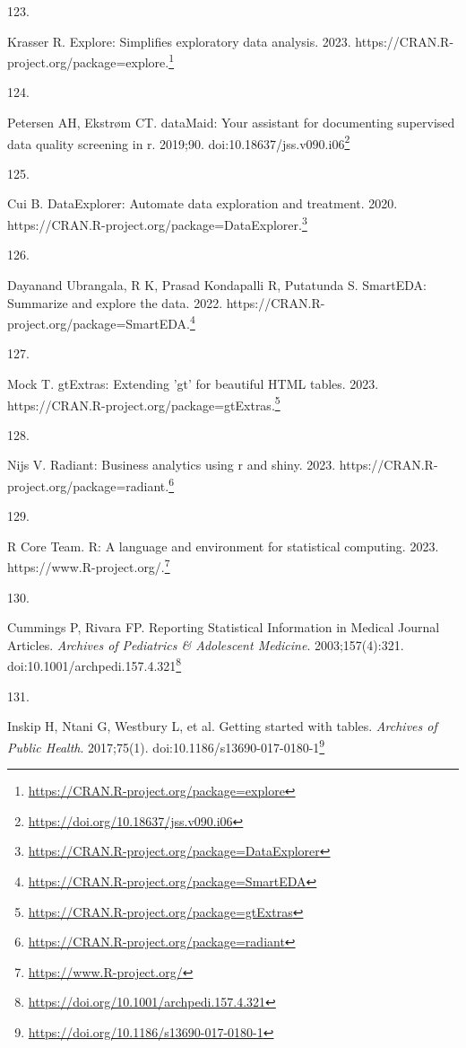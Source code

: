 \documentclass[
  a4paper,
]{book}
\newlength{\cslhangindent}
\newlength{\csllabelwidth}
\newlength{\cslentryspacingunit} %
\newenvironment{CSLReferences}[2] %
 {%
  \setlength{\parindent}{0pt}
  \ifodd #1
  \let\oldpar\par
  \def\par{\hangindent=\cslhangindent\oldpar}
  \fi
  \setlength{\parskip}{#2\cslentryspacingunit}
 }%
 {}
\newcommand{\CSLLeftMargin}[1]{\parbox[t]{\csllabelwidth}{#1}}
\newcommand{\CSLRightInline}[1]{\parbox[t]{\linewidth - \csllabelwidth}{#1}\break}
\renewcommand{\href}[2]{#2\footnote{\url{#1}}}
\begin{document}
\begin{CSLReferences}{0}{0}
\leavevmode{}%
\CSLLeftMargin{123. }%
\CSLRightInline{Krasser R. Explore: Simplifies exploratory data analysis. 2023. \href{https://CRAN.R-project.org/package=explore}{https://CRAN.R-project.org/package=explore.}}

\leavevmode{}%
\CSLLeftMargin{124. }%
\CSLRightInline{Petersen AH, Ekstrøm CT. {\textbraceleft}dataMaid{\textbraceright}: Your assistant for documenting supervised data quality screening in {\textbraceleft}r{\textbraceright}. 2019;90. doi:\href{https://doi.org/10.18637/jss.v090.i06}{10.18637/jss.v090.i06}}

\leavevmode{}%
\CSLLeftMargin{125. }%
\CSLRightInline{Cui B. DataExplorer: Automate data exploration and treatment. 2020. \href{https://CRAN.R-project.org/package=DataExplorer}{https://CRAN.R-project.org/package=DataExplorer.}}

\leavevmode{}%
\CSLLeftMargin{126. }%
\CSLRightInline{Dayanand Ubrangala, R K, Prasad Kondapalli R, Putatunda S. SmartEDA: Summarize and explore the data. 2022. \href{https://CRAN.R-project.org/package=SmartEDA}{https://CRAN.R-project.org/package=SmartEDA.}}

\leavevmode{}%
\CSLLeftMargin{127. }%
\CSLRightInline{Mock T. gtExtras: Extending 'gt' for beautiful HTML tables. 2023. \href{https://CRAN.R-project.org/package=gtExtras}{https://CRAN.R-project.org/package=gtExtras.}}

\leavevmode{}%
\CSLLeftMargin{128. }%
\CSLRightInline{Nijs V. Radiant: Business analytics using r and shiny. 2023. \href{https://CRAN.R-project.org/package=radiant}{https://CRAN.R-project.org/package=radiant.}}

\leavevmode{}%
\CSLLeftMargin{129. }%
\CSLRightInline{R Core Team. R: A language and environment for statistical computing. 2023. \href{https://www.R-project.org/}{https://www.R-project.org/.}}

\leavevmode{}%
\CSLLeftMargin{130. }%
\CSLRightInline{Cummings P, Rivara FP. Reporting Statistical Information in Medical Journal Articles. \emph{Archives of Pediatrics \& Adolescent Medicine}. 2003;157(4):321. doi:\href{https://doi.org/10.1001/archpedi.157.4.321}{10.1001/archpedi.157.4.321}}

\leavevmode{}%
\CSLLeftMargin{131. }%
\CSLRightInline{Inskip H, Ntani G, Westbury L, et al. Getting started with tables. \emph{Archives of Public Health}. 2017;75(1). doi:\href{https://doi.org/10.1186/s13690-017-0180-1}{10.1186/s13690-017-0180-1}}


\end{CSLReferences}
\end{document}
